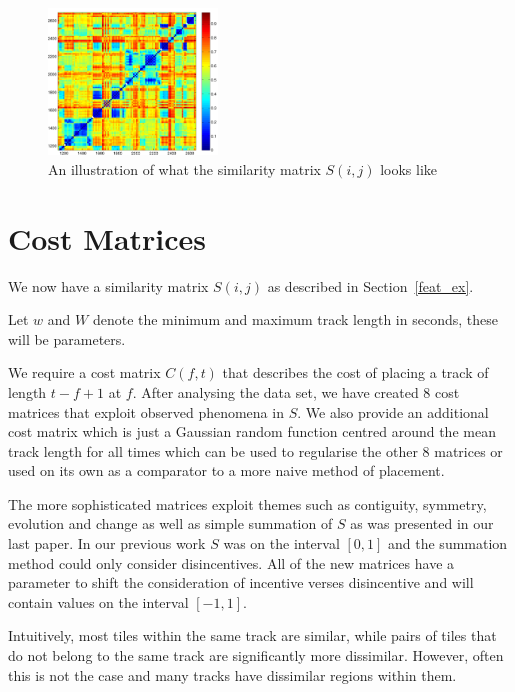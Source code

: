 \documentclass[twocolumn]{article}
\begin{document}
\begin{figure}[t]
	\centering
	\includegraphics[width=0.4\textwidth]{images/simmat_plain}
	
	\caption{An illustration of what the similarity matrix $S(i,j)$ looks like}
	\label{fig:simmatrix}
\end{figure} 

\section{Cost Matrices}\label{costmatrix_sec} %

We now have a similarity matrix $S(i,j)$ as described in Section~\ref{feat_ex}. 

Let $w$ and $W$ denote the minimum and maximum track length in seconds, these will be parameters.

We require a cost matrix $C(f,t)$ that describes the cost of placing a track of length $t-f+1$ at $f$. After analysing the data set, we have created $8$ cost matrices that exploit observed phenomena in $S$. We also provide an additional cost matrix which is just a Gaussian random function centred around the mean track length for all times which can be used to regularise the other $8$ matrices or used on its own as a comparator to a more naive method of placement. 

The more sophisticated matrices exploit themes such as contiguity, symmetry, evolution and change as well as simple summation of $S$ as was presented in our last paper. In our previous work \cite{scarfe2013long} $S$ was on the interval $[0,1]$ and the summation method could only consider disincentives. All of the new matrices have a parameter to shift the consideration of incentive verses disincentive and will contain values on the interval $[-1,1]$.

Intuitively, most tiles within the same track are similar, while pairs of tiles that do not belong to the same track are significantly more dissimilar. However, often this is not the case and many tracks have dissimilar regions within them. 
\end{document}
